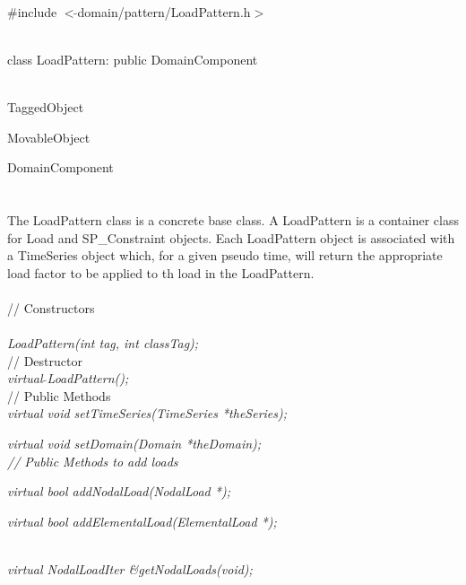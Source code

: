 
   \\
\#include $<\tilde{ }$domain/pattern/LoadPattern.h$>$  


  \\
class LoadPattern: public DomainComponent  


 \\
TaggedObject 

MovableObject 

\indent\indent DomainComponent \\
\indent\indent{} \\

 \\ 
\indent The LoadPattern class is a concrete base class. A
LoadPattern is a container class for Load and SP\_Constraint
objects. Each LoadPattern object is associated with a TimeSeries
object which, for a given pseudo time, will return the appropriate
load factor to be applied to th load in the LoadPattern. \\

 \\
\indent // Constructors \\ 
\\ 
{\em LoadPattern(int tag, int classTag);}\\ 

\indent // Destructor \\ 
{\em virtual $\tilde{ }$LoadPattern();}\\  

\indent // Public Methods \\ 
{\em virtual void setTimeSeries(TimeSeries *theSeries);}

{\em virtual void setDomain(Domain *theDomain);}\\ 

{\em  // Public Methods to add loads}

{\em  virtual bool addNodalLoad(NodalLoad *);}

{\em  virtual bool addElementalLoad(ElementalLoad *);}

\\ 
{\em  virtual NodalLoadIter     \&getNodalLoads(void);}

